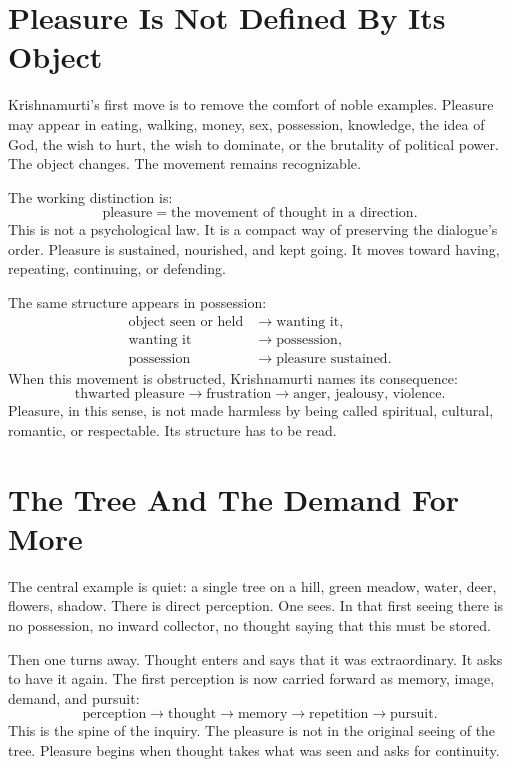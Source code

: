 \documentclass[11pt,oneside]{book}
\begin{document}
\section{Pleasure Is Not Defined By Its Object}

Krishnamurti's first move is to remove the comfort of noble examples. Pleasure may appear in eating, walking, money, sex, possession, knowledge, the idea of God, the wish to hurt, the wish to dominate, or the brutality of political power. The object changes. The movement remains recognizable.

The working distinction is:
\begin{equation}
\text{pleasure} = \text{the movement of thought in a direction}.
\end{equation}
This is not a psychological law. It is a compact way of preserving the dialogue's order. Pleasure is sustained, nourished, and kept going. It moves toward having, repeating, continuing, or defending.

The same structure appears in possession:
\begin{align}
\text{object seen or held} &\longrightarrow \text{wanting it},\\
\text{wanting it} &\longrightarrow \text{possession},\\
\text{possession} &\longrightarrow \text{pleasure sustained}.
\end{align}
When this movement is obstructed, Krishnamurti names its consequence:
\begin{equation}
\text{thwarted pleasure}
\longrightarrow
\text{frustration}
\longrightarrow
\text{anger, jealousy, violence}.
\end{equation}
Pleasure, in this sense, is not made harmless by being called spiritual, cultural, romantic, or respectable. Its structure has to be read.

\section{The Tree And The Demand For More}

The central example is quiet: a single tree on a hill, green meadow, water, deer, flowers, shadow. There is direct perception. One sees. In that first seeing there is no possession, no inward collector, no thought saying that this must be stored.

Then one turns away. Thought enters and says that it was extraordinary. It asks to have it again. The first perception is now carried forward as memory, image, demand, and pursuit:
\begin{equation}
\text{perception}
\longrightarrow
\text{thought}
\longrightarrow
\text{memory}
\longrightarrow
\text{repetition}
\longrightarrow
\text{pursuit}.
\end{equation}
This is the spine of the inquiry. The pleasure is not in the original seeing of the tree. Pleasure begins when thought takes what was seen and asks for continuity.
\end{document}

